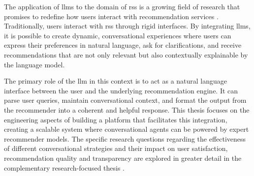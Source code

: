The application of \acp{llm} to the domain of \acl{rs}s is a growing field of research that promises to redefine how users interact with recommendation services \cite{SOTA-CRS-LLM}. Traditionally, users interact with \acl{rs}s through rigid interfaces. By integrating \acp{llm}, it is possible to create dynamic, conversational experiences where users can express their preferences in natural language, ask for clarifications, and receive recommendations that are not only relevant but also contextually explainable by the language model.

The primary role of the \ac{llm} in this context is to act as a natural language interface between the user and the underlying recommendation engine. It can parse user queries, maintain conversational context, and format the output from the recommender into a coherent and helpful response. This thesis focuses on the engineering aspects of building a platform that facilitates this integration, creating a scalable system where conversational agents can be powered by expert recommender models. The specific research questions regarding the effectiveness of different conversational strategies and their impact on user satisfaction, recommendation quality and transparency are explored in greater detail in the complementary research-focused thesis \cite{MUI2ICSI:SOTA}.